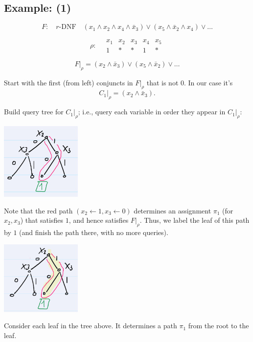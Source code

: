 \subsection*{Example: (1)}

\[
F: \quad r\text{-DNF} \quad (x_1 \land x_2 \land x_4 \land \bar{x}_3) \lor (x_5 \land \bar{x}_2 \land x_4) \lor \dots
\]

\[
\rho: \quad 
\begin{array}{ccccc}
x_1 & x_2 & x_3 & x_4 & x_5 \\
1 & * & * & 1 & *
\end{array}
\]

\[
F|_{\rho} = (x_2 \land \bar{x}_3) \lor (x_5 \land \bar{x}_2) \lor \dots
\]

\noindent
Start with the first (from left) conjuncts in \( F|_{\rho} \) that is not \( 0 \). In our case it's
\[
C_1|_{\rho} = (x_2 \land \bar{x}_3).
\]

\noindent
Build query tree for \( C_1|_{\rho} \); i.e., query each variable in order they appear in \( C_1|_{\rho} \):
 
 
 \includegraphics[width=0.3\textwidth]{images/1st-ex-dt.png}
 
 
\noindent
Note that the red path \((x_2 \gets 1, x_3 \gets 0)\) determines an assignment \( \pi_1 \) (for \( x_2, x_3 \)) that satisfies \( 1 \), and hence satisfies \( F|_{\rho} \). Thus, we label the leaf of this path by \( 1 \) (and finish the path there, with no more queries).


\noindent 



\includegraphics[width=0.3\textwidth]{images/ex2-sl-dt.png}

\noindent
Consider each leaf in the tree above. It determines a path \( \pi_1 \) from the root to the leaf.

